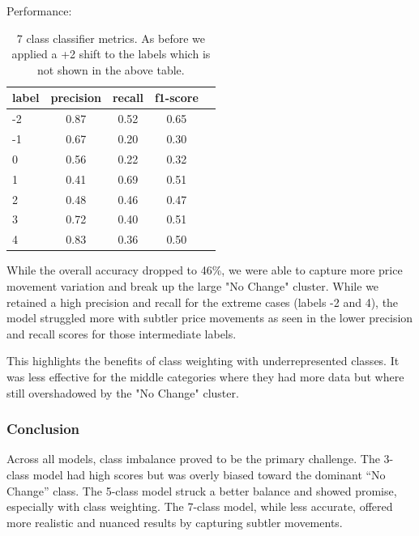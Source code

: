 \documentclass[twocolumn]{article}
\begin{document}
Performance:

\begin{table}[h!]
\centering
\small
\begin{tabular}{|l|c|c|c|c|}
\hline
\textbf{label} & \textbf{precision} & \textbf{recall} & \textbf{f1-score} \\
\hline
               -2   &    0.87  &    0.52  &    0.65 \\
               -1   &    0.67  &    0.20  &    0.30 \\
               0   &    0.56  &    0.22  &    0.32 \\
               1   &    0.41  &    0.69  &    0.51 \\
               2   &    0.48  &    0.46  &    0.47 \\
               3   &    0.72  &    0.40  &    0.51 \\
               4   &    0.83  &    0.36  &    0.50 \\
\hline
\end{tabular}
\caption{7 class classifier metrics. As before we applied a +2 shift to the labels which is not shown in the above table.}
\label{tab:7-class-metrics}
\end{table}

While the overall accuracy dropped to 46\%, we were able to capture more price movement variation and break up the large "No Change" cluster. 
While we retained a high precision and recall for the extreme cases (labels -2 and 4), the model struggled more with subtler price movements as seen in the lower precision and recall scores for those intermediate labels. 

This highlights the benefits of class weighting with underrepresented classes. It was less effective for the middle categories where they had more data but where still overshadowed by the "No Change" cluster.

\subsubsection*{Conclusion}

Across all models, class imbalance proved to be the primary challenge. The 3-class model had high scores but was overly biased toward the dominant “No Change” class. The 5-class model struck a better balance and showed promise, especially with class weighting. The 7-class model, while less accurate, offered more realistic and nuanced results by capturing subtler movements. 
\end{document}

